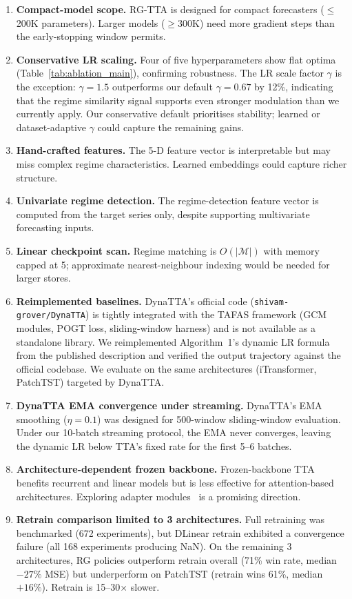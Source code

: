 \documentclass[journal]{IEEEtran}
\begin{document}
\begin{enumerate}[nosep]
  \item \textbf{Compact-model scope.} RG-TTA is designed for compact forecasters ($\leq$200K parameters). Larger models ($\geq$300K) need more gradient steps than the early-stopping window permits.
  \item \textbf{Conservative LR scaling.} Four of five hyperparameters show flat optima (Table~\ref{tab:ablation_main}), confirming robustness. The LR scale factor $\gamma$ is the exception: $\gamma=1.5$ outperforms our default $\gamma=0.67$ by 12\%, indicating that the regime similarity signal supports even stronger modulation than we currently apply. Our conservative default prioritises stability; learned or dataset-adaptive $\gamma$ could capture the remaining gains.
  \item \textbf{Hand-crafted features.} The 5-D feature vector is interpretable but may miss complex regime characteristics. Learned embeddings could capture richer structure.
  \item \textbf{Univariate regime detection.} The regime-detection feature vector is computed from the target series only, despite supporting multivariate forecasting inputs.
  \item \textbf{Linear checkpoint scan.} Regime matching is $O(|\mathcal{M}|)$ with memory capped at 5; approximate nearest-neighbour indexing would be needed for larger stores.
  \item \textbf{Reimplemented baselines.} DynaTTA's official code (\texttt{shivam-grover/DynaTTA}) is tightly integrated with the TAFAS framework (GCM modules, POGT loss, sliding-window harness) and is not available as a standalone library. We reimplemented Algorithm~1's dynamic LR formula from the published description and verified the output trajectory against the official codebase. We evaluate on the same architectures (iTransformer, PatchTST) targeted by DynaTTA.
  \item \textbf{DynaTTA EMA convergence under streaming.} DynaTTA's EMA smoothing ($\eta=0.1$) was designed for 500-window sliding-window evaluation. Under our 10-batch streaming protocol, the EMA never converges, leaving the dynamic LR below TTA's fixed rate for the first 5--6 batches.
  \item \textbf{Architecture-dependent frozen backbone.} Frozen-backbone TTA benefits recurrent and linear models but is less effective for attention-based architectures. Exploring adapter modules~\cite{houlsby2019adapters} is a promising direction.
  \item \textbf{Retrain comparison limited to 3 architectures.} Full retraining was benchmarked (672 experiments), but DLinear retrain exhibited a convergence failure (all 168 experiments producing NaN). On the remaining 3 architectures, RG policies outperform retrain overall (71\% win rate, median $-27\%$ MSE) but underperform on PatchTST (retrain wins 61\%, median $+16\%$). Retrain is 15--30$\times$ slower.
\end{enumerate}
\end{document}
